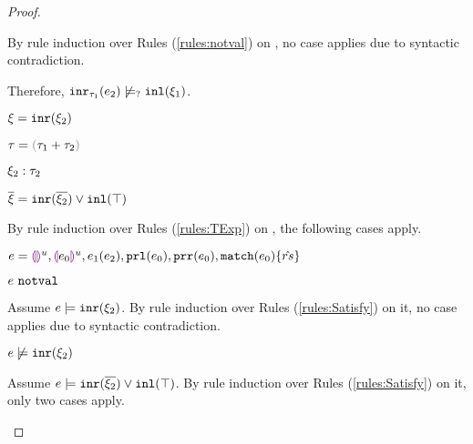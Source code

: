 \begin{proof}
\begin{byCases}
\begin{byCases}
\begin{byCases}
\begin{pfsteps*}
            \end{pfsteps*}
            By rule induction over Rules (\ref{rules:notval}) on , no case applies due to syntactic contradiction.
        \end{byCases}
        Therefore, $\mathtt{inr}_{\tau_1}({e_2}) \not\models_{?} \mathtt{inl}(\xi_1)$.
    \end{byCases}
\item[\text{(\ref{rule:CTInr})}]
    \begin{pfsteps*}
    \item $\xi=\mathtt{inr}(\xi_2)$ 
    \item $\tau=\tsum{\tau_1}{\tau_2}$ 
    \item $\xi_2 : \tau_2$  
    \item $\overline{\xi}=\mathtt{inr}(\overline{\xi_2}) \vee \mathtt{inl}(\top)$ 
    \end{pfsteps*}
    By rule induction over Rules (\ref{rules:TExp}) on , the following cases apply.
    \begin{byCases}
    \item[\text{(\ref{rule:TEHole}),(\ref{rule:THole}),(\ref{rule:TAp}),(\ref{rule:TPrl}),(\ref{rule:TPrr}),(\ref{rule:TMatchZPre}),(\ref{rule:TMatchNZPre})}]
        \begin{pfsteps*}
        \item $e=\textcolor{violet}{\llparenthesis}\textcolor{violet}{\rrparenthesis}^{u},\textcolor{violet}{\llparenthesis} e_0\textcolor{violet}{\rrparenthesis}^{u},e_1(e_2),\mathtt{prl}(e_0),\mathtt{prr}(e_0),\mathtt{match}(e_0) \{\hat{rs}\}$ 
        \item $e ~\mathtt{notval}$  
        \end{pfsteps*}
        Assume $e \models \mathtt{inr}(\xi_2)$. By rule induction over Rules (\ref{rules:Satisfy}) on it, no case applies due to syntactic contradiction.
        \begin{pfsteps*}
        \item $e \not\models \mathtt{inr}(\xi_2)$  
        \end{pfsteps*}
        Assume $e \models \mathtt{inr}(\overline{\xi_2}) \vee \mathtt{inl}(\top)$. By rule induction over Rules (\ref{rules:Satisfy}) on it, only two cases apply.
        \begin{byCases}
        \item[\text{(\ref{rule:CSOr1})}]

\end{byCases}
\end{byCases}
\end{byCases}
\end{proof}
